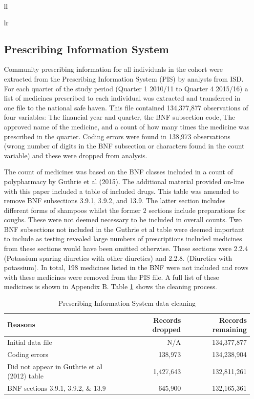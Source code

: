 \documentclass[12pt,a4paper,oneside,table]{report}
\begin{document}
\begin{tabular}[t]{ll}
\begin{tabular}{lr}
{\subsection{Prescribing Information System}\label{subsec:pis-summs}

Community prescribing information for all individuals in the cohort were
extracted from the Prescribing Information System (PIS) by analysts from
ISD. For each quarter of the study period (Quarter 1 2010/11 to Quarter
4 2015/16) a list of medicines prescribed to each individual was
extracted and transferred in one file to the national safe haven. This
file contained 134,377,877 observations of four variables: The financial
year and quarter, the BNF subsection code, The approved name of the
medicine, and a count of how many times the medicine was prescribed in
the quarter. Coding errors were found in 138,973 observations (wrong
number of digits in the BNF subsection or characters found in the count
variable) and these were dropped from analysis.

The count of medicines was based on the BNF classes included in a count
of polypharmacy by Guthrie et al (2015). The additional material
provided on-line with this paper included a table of included drugs.
This table was amended to remove BNF subsections 3.9.1, 3.9.2, and 13.9.
The latter section includes different forms of shampoos whilst the
former 2 sections include preparations for coughs. These were not deemed
necessary to be included in overall counts. Two BNF subsections not
included in the Guthrie et al table were deemed important to include as
testing revealed large numbers of prescriptions included medicines from
these sections would have been omitted otherwise. These sections were
2.2.4 (Potassium sparing diuretics with other diuretics) and 2.2.8.
(Diuretics with potassium). In total, 198 medicines listed in the BNF
were not included and rows with these medicines were removed from the
PIS file. A full list of these medicines is shown in Appendix B. Table
\ref{tab:dropped-meds} shows the cleaning process.

\begin{table}[h]
\scriptsize
\centering
\begin{tabular}{@{}lrr@{}}
\toprule
Reasons & Records dropped & Records remaining \\ \midrule
Initial data file & N/A & 134,377,877 \\
Coding errors & 138,973 & 134,238,904 \\
Did not appear in Guthrie et al (2012) table & 1,427,643 & 132,811,261 \\
BNF sections 3.9.1, 3.9.2, \& 13.9 & 645,900 & 132,165,361 \\ \bottomrule
\end{tabular}
\caption{Prescribing Information System data cleaning}
\label{tab:dropped-meds}
\end{table}

}
\end{tabular}
\end{tabular}
\end{document}

